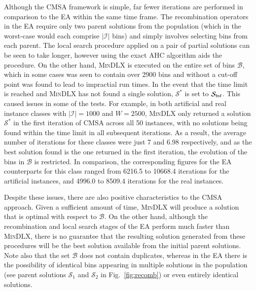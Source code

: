 \documentclass[a4paper,11pt,authoryear]{elsarticle}
\begin{document}
Although the CMSA framework is simple, far fewer iterations are performed in comparison to the EA within the same time frame. The recombination operators in the EA require only two parent solutions from the population (which in the worst-case would each comprise $|\mathcal{I}|$ bins) and simply involves selecting bins from each parent. The local search procedure applied on a pair of partial solutions can be seen to take longer, however using the exact AHC algorithm aids the procedure. On the other hand, \textsc{MinDLX} is executed on the entire set of bins $\mathcal{B}$, which in some cases was seen to contain over 2900 bins and without a cut-off point was found to lead to impractial run times. In the event that the time limit is reached and \textsc{MinDLX} has not found a single solution, $\mathcal{S}^*$ is set to $\mathcal{S}_{\textup{bsf}}$. This caused issues in some of the tests. For example, in both artificial and real instance classes with $|\mathcal{I}| = 1000$ and $W =2500$, \textsc{MinDLX} only returned a solution $\mathcal{S}^*$ in the first iteration of CMSA across all 50 instances, with no solutions being found within the time limit in all subsequent iterations. As a result, the average number of iterations for these classes were just 7 and 6.98 respectively, and as the best solution found is the one returned in the first iteration, the evolution of the bins in $\mathcal{B}$ is restricted. In comparison, the corresponding figures for the EA counterparts for this class ranged from 6216.5 to 10668.4 iterations for the artificial instances, and 4996.0 to 8509.4 iterations for the real instances.

Despite these issues, there are also positive characteristics to the CMSA approach. Given a sufficient amount of time, \textsc{MinDLX} will produce a solution that is optimal with respect to $\mathcal{B}$. On the other hand, although the recombination and local search stages of the EA perform much faster than \textsc{MinDLX}, there is no guarantee that the resulting solution generated from these procedures will be the best solution available from the initial parent solutions. Note also that the set $\mathcal{B}$ does not contain duplicates, whereas in the EA there is the possibility of identical bins appearing in multiple solutions in the population (see parent solutions $\mathcal{S}_1$ and $\mathcal{S}_2$ in Fig.~\ref{fig:recomb}) or even entirely identical solutions.


\end{document}
